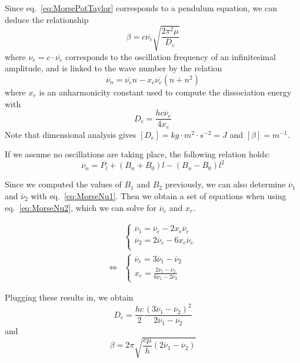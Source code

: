 \documentclass[12pt]{article}
\begin{document}
Since eq.~\ref{eq:MorsePotTaylor} corresponds to a pendulum equation, we can deduce the relationship
\begin{equation}
    \beta = c\overline{\nu_e} \sqrt{\frac{2 \pi^2 \mu}{D_e}}
\end{equation}
where $\nu_e = c \cdot \overline{\nu_e}$ corresponds to the oscillation frequency of an infinitesimal amplitude, and is linked to the wave number by the relation
\begin{equation}
    \overline{\nu}_n = \overline{\nu_e}n - x_e \overline{\nu_e} (n+n^2)
    \label{eq:MorseNu2}
\end{equation}
where $x_e$ is an anharmonicity constant used to compute the dissociation energy with
\begin{equation}
    D_e = \frac{h c \overline{\nu}_e}{4 x_e}
\end{equation}
Note that dimensional analysis gives $[D_e] = \si{kg} \cdot \si{m^2} \cdot \si{s^{-2}} = \si{J}$ and $[\beta] = \si{m^{-1}}$.

If we assume no oscillations are taking place, the following relation holds:
\begin{equation}
    \overline{\nu}_n = P_l + (B_n + B_0)l - (B_n - B_0)l^2
    \label{eq:MorseNu1}
\end{equation}

Since we computed the values of $B_1$ and $B_2$ previously, we can also determine $\overline{\nu}_1$ and $\overline{\nu}_2$ with eq.~\ref{eq:MorseNu1}. Then we obtain a set of equations when using eq.~\ref{eq:MorseNu2}, which we can solve for $\overline{\nu}_e$ and $x_e$.

\begin{align}
    &\begin{cases}
        \overline{\nu}_1 = \overline{\nu}_e - 2 x_e \overline{\nu}_e\\
        \overline{\nu}_2 = 2 \overline{\nu}_e - 6 x_e \overline{\nu}_e \\
    \end{cases} \\
    \Leftrightarrow & \begin{cases}
        \overline{\nu}_e = 3 \overline{\nu}_1 - \overline{\nu}_2 \\
        x_e = \frac{2\overline{\nu}_1 - \overline{\nu}_2}{6\overline{\nu}_1 - 2 \overline{\nu}_2}
    \end{cases}
\end{align}

Plugging these results in, we obtain
\begin{equation}
    D_e = \frac{h c}{2} \frac{(3\overline{\nu}_1 - \overline{\nu}_2)^2}{2 \overline{\nu}_1 - \overline{\nu}_2}
\end{equation}
and 
\begin{equation}
    \beta = 2 \pi \sqrt{\frac{c \mu}{h} ( 2 \overline{\nu}_1 - \overline{\nu}_2) }
\end{equation}
\end{document}
